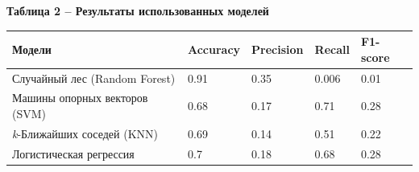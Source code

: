 \begin{table}[]
	{\bfseries Таблица 2 -- Результаты использованных моделей}\\[10pt]
	\centering
	\begin{tabular}{|l|l|l|l|l|}
	\hline
	Модели                        & Accuracy & Precision & Recall & F1-score \\ \hline
	Случайный лес (Random Forest) & 0.91     & 0.35      & 0.006  & 0.01     \\ \hline
	Машины опорных векторов (SVM) & 0.68     & 0.17      & 0.71   & 0.28     \\ \hline
	\emph{k}-Ближайших соседей (KNN)      & 0.69     & 0.14      & 0.51   & 0.22     \\ \hline
	Логистическая регрессия       & 0.7      & 0.18      & 0.68   & 0.28     \\ \hline
	\end{tabular}
	\end{table}

